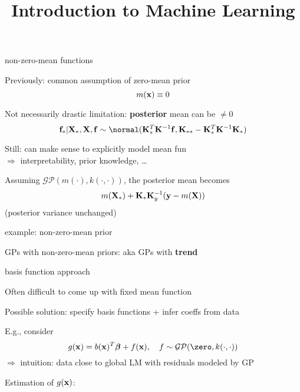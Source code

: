 \documentclass[11pt,compress,t,notes=noshow, xcolor=table]{beamer}
\title{Introduction to Machine Learning}
\begin{document}


\begin{framei}[sep=L]{non-zero-mean functions}
\item Previously: common assumption of zero-mean prior $$m(\mathbf{x}) \equiv 0$$
\item Not necessarily drastic limitation: \textbf{posterior} mean can be $\neq 0$
$$\fv_\ast | \Xmat_*, \Xmat, \fv \sim \normal(\Kmat_{*}^{T}\Kmat^{-1}\fv, \Kmat_{**} - \Kmat_*^T \Kmat ^{-1}\Kmat_*)$$
\item Still: can make sense to explicitly model mean fun \\$\Rightarrow$ interpretability, prior knowledge, \dots
\item Assuming $\mathcal{GP}(m(\cdot), k(\cdot, \cdot))$, the posterior mean becomes
$$m(\mathbf{X}_*) + \mathbf{K}_* \mathbf{K}_y^{-1} (\mathbf{y} - m(\mathbf{X}))$$
(posterior variance unchanged)
\end{framei}

\begin{framei}[sep=L]{example: non-zero-mean prior}
\item GPs with non-zero-mean priors: aka GPs with \textbf{trend}
\vfill
{}
\vfill
{}
\end{framei}

\begin{framei}[sep=L]{basis function approach}
\item Often difficult to come up with fixed mean function
\item Possible solution: specify basis functions + infer coeffs from data
\item E.g., consider $$g(\xv) = b(\xv)^T\bm{\beta} + \fx, \quad f  \sim \mathcal{GP}(\zero, k(\cdot, \cdot))$$
$\Rightarrow$ intuition: data close to global LM with residuals modeled by GP
\item Estimation of $g(\mathbf{x})$: 
\end{framei}

\endlecture
\end{document}
